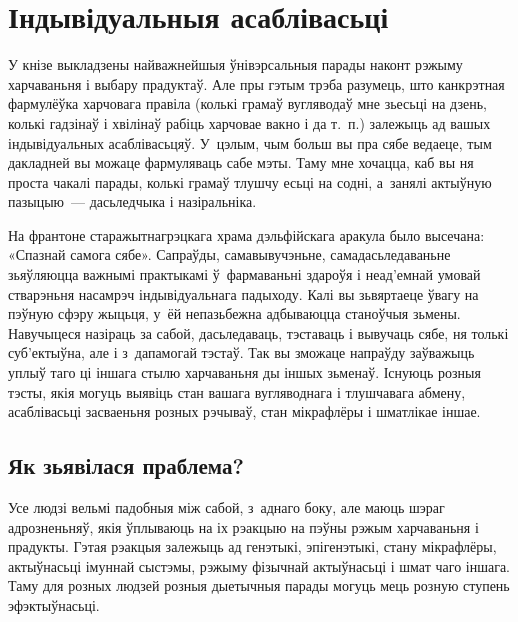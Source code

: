 \chapter{Індывідуальныя асаблівасьці}

У кнізе выкладзены найважнейшыя ўнівэрсальныя парады наконт рэжыму харчаваньня і выбару прадуктаў. Але пры гэтым трэба разумець, што канкрэтная фармулёўка харчовага правіла (колькі грамаў вугляводаў мне зьесьці на дзень, колькі гадзінаў і хвілінаў рабіць харчовае вакно і да т.~п.) залежыць ад вашых індывідуальных асаблівасьцяў. У~цэлым, чым больш вы пра сябе ведаеце, тым дакладней вы можаце фармуляваць сабе мэты. Таму мне хочацца, каб вы ня проста чакалі парады, колькі грамаў тлушчу есьці на содні, а~занялі актыўную пазыцыю~--- дасьледчыка і назіральніка.


На франтоне старажытнагрэцкага храма дэльфійскага аракула было высечана: «Спазнай самога сябе». Сапраўды, самавывучэньне, самадасьледаваньне зьяўляюцца важнымі практыкамі ў~фармаваньні здароўя і неад'емнай умовай стварэньня насамрэч індывідуальнага падыходу. Калі вы зьвяртаеце ўвагу на пэўную сфэру жыцьця, у~ёй непазьбежна адбываюцца станоўчыя зьмены. Навучыцеся назіраць за сабой, дасьледаваць, тэставаць і вывучаць сябе, ня толькі суб'ектыўна, але і з~дапамогай тэстаў. Так вы зможаце напраўду заўважыць уплыў таго ці іншага стылю харчаваньня ды іншых зьменаў. Існуюць розныя тэсты, якія могуць выявіць стан вашага вугляводнага і тлушчавага абмену, асаблівасьці засваеньня розных рэчываў, стан мікрафлёры і шматлікае іншае.

\section{Як зьявілася праблема?}

Усе людзі вельмі падобныя між сабой, з~аднаго боку, але маюць шэраг адрозненьняў, якія ўплываюць на іх рэакцыю на пэўны рэжым харчаваньня і прадукты. Гэтая рэакцыя залежыць ад генэтыкі, эпігенэтыкі, стану мікрафлёры, актыўнасьці імуннай сыстэмы, рэжыму фізычнай актыўнасьці і шмат чаго іншага. Таму для розных людзей розныя дыетычныя парады могуць мець розную ступень эфэктыўнасьці.

